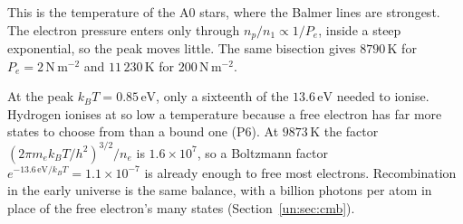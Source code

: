 This is the temperature of the A0 stars, where the Balmer lines are strongest. The electron pressure enters only through $n_p/n_1\propto1/P_e$, inside a steep exponential, so the peak moves little. The same bisection gives $8790\,\mathrm K$ for $P_e=2\,\mathrm{N\,m^{-2}}$ and $11\,230\,\mathrm K$ for $200\,\mathrm{N\,m^{-2}}$.

At the peak $k_BT=0.85\,\mathrm{eV}$, only a sixteenth of the $13.6\,\mathrm{eV}$ needed to ionise. Hydrogen ionises at so low a temperature because a free electron has far more states to choose from than a bound one (P6). At $9873\,\mathrm K$ the factor $(2\pi m_ek_BT/h^2)^{3/2}/n_e$ is $1.6\times10^7$, so a Boltzmann factor $e^{-13.6\,\mathrm{eV}/k_BT}=1.1\times10^{-7}$ is already enough to free most electrons. Recombination in the early universe is the same balance, with a billion photons per atom in place of the free electron's many states (Section~\ref{un:sec:cmb}).

